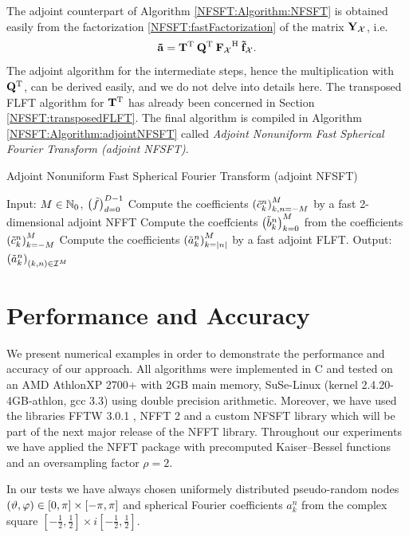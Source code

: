 The adjoint counterpart of Algorithm \ref{NFSFT:Algorithm:NFSFT} is obtained easily from the factorization 
\eqref{NFSFT:fastFactorization} of the matrix $\mathbf{Y}_{\mathcal{X}}$, i.e.
\[
  \mathbf{\tilde{a}} = \mathbf{T}^{\text{\rm{T}}} \: \mathbf{Q}^{\text{\rm{T}}} \: {\mathbf{F}_{\mathcal{X}}}^{\text{\rm{H}}} \: \mathbf{\tilde{f}}_{\mathcal{X}}.
\]
The adjoint algorithm for the intermediate steps, hence the multiplication with $\mathbf{Q}^{\text{\rm{T}}}$, can be derived easily, 
and we do not delve into details here. The transposed FLFT algorithm for $\mathbf{T}^{\text{\rm{T}}}$ has already been concerned 
in Section \ref{NFSFT:transposedFLFT}. The final algorithm is compiled in Algorithm \ref{NFSFT:Algorithm:adjointNFSFT} 
called \emph{Adjoint Nonuniform Fast Spherical Fourier Transform (adjoint NFSFT)}.

\begin{algorithm}[tb]
  \caption{Adjoint Nonuniform Fast Spherical Fourier Transform (adjoint NFSFT)}
  \label{NFSFT:Algorithm:adjointNFSFT}    
  \begin{algorithmic}
    \STATE Input:  $M \in \mathbb{N}_{0}$, $\left(\tilde{f}\right)_{d=0}^{D-1}$
    \STATE Compute the coefficients $\left(\tilde{c}_{k}^n\right)_{k,n=-M}^M$ by a fast 2-dimensional adjoint NFFT
      \STATE Compute the coeffcients $\left(\tilde{b}_{k}^n\right)_{k=0}^M$ from the coefficients $\left(\tilde{c}_{k}^n\right)_{k=-M}^{M}$ 
      \STATE Compute the coefficients $\left(\tilde{a}_{k}^n\right)_{k=|n|}^{M}$ by a fast adjoint FLFT.
    \ENDFOR
    \STATE Output: $\left(\tilde{a}_{k}^n\right)_{(k,n) \in \mathcal{I}^M}$
\end{algorithmic}
\end{algorithm}

\section{Performance and Accuracy}
\label{NFSFT:tests}
We present numerical examples in order to demonstrate the performance and accuracy of our approach. All algorithms were implemented in C and tested on an 
AMD Athlon\texttrademark XP 2700+ with 2GB main memory, SuSe-Linux 
(kernel 2.4.20-4GB-athlon, gcc 3.3) using double precision arithmetic. 
Moreover, we have used the libraries FFTW 3.0.1 \cite{fftw}, NFFT 2
\cite{kupo02C} and a custom NFSFT library which will be part of the next 
major release of the NFFT library. Throughout our experiments we have 
applied the NFFT package \cite{kupo02C} with precomputed Kaiser--Bessel 
functions and an oversampling factor $\rho=2$.

In our tests we have always chosen uniformely distributed pseudo-random 
nodes $\left(\vartheta,\varphi\right) \in [0,\pi] \times [-\pi,\pi]$ and 
spherical Fourier coefficients $a_{k}^n$ from the complex square
$\left[-\frac{1}{2},\frac{1}{2}\right] \times 
i\left[-\frac{1}{2},\frac{1}{2}\right]$.

